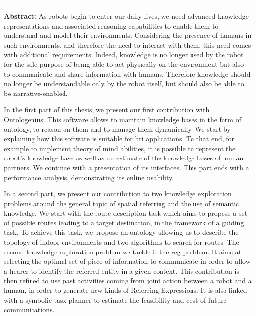 \documentclass[english,a4paper,11pt,twoside]{StyleThese}
\begin{document}
\cleardoublepage
\begin{vcenterpage}
\noindent\rule[2pt]{\textwidth}{0.5pt}


\textbf{Abstract:}
As robots begin to enter our daily lives, we need advanced knowledge representations and associated reasoning capabilities to enable them to understand and model their environments. Considering the presence of humans in such environments, and therefore the need to interact with them, this need comes with additional requirements. Indeed, knowledge is no longer used by the robot for the sole purpose of being able to act physically on the environment but also to communicate and share information with humans. Therefore knowledge should no longer be understandable only by the robot itself, but should also be able to be narrative-enabled. 

In the first part of this thesis, we present our first contribution with Ontologenius. This software allows to maintain knowledge bases in the form of ontology, to reason on them and to manage them dynamically. We start by explaining how this software is suitable for \acrfull{hri} applications. To that end, for example to implement theory of mind abilities, it is possible to represent the robot’s knowledge base as well as an estimate of the knowledge bases of human partners. We continue with a presentation of its interfaces. This part ends with a performance analysis, demonstrating its online usability. 
 
In a second part, we present our contribution to two knowledge exploration problems around the general topic of spatial referring and the use of semantic knowledge. We start with the route description task which aims to propose a set of possible routes leading to a target destination, in the framework of a guiding task. To achieve this task, we propose an ontology allowing us to describe the topology of indoor environments and two algorithms to search for routes. The second knowledge exploration problem we tackle is the \acrfull{reg} problem. It aims at selecting the optimal set of piece of information to communicate in order to allow a hearer to identify the referred entity in a given context. This contribution is then refined to use past activities coming from joint action between a robot and a human, in order to generate new kinds of Referring Expressions. It is also linked with a symbolic task planner to estimate the feasibility and cost of future communications. 


\end{vcenterpage}
\end{document}
